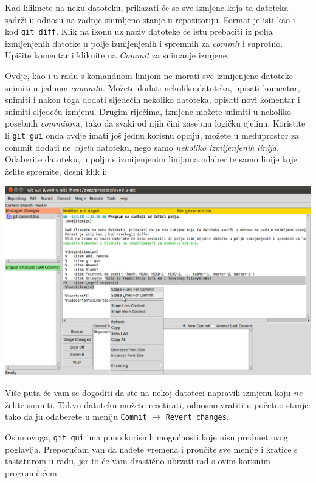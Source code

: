Kad kliknete na neku datoteku, prikazati će se sve izmjene koja ta datoteka sadrži u odnosu na zadnje snimljeno stanje u repozitoriju.
Format je isti kao i kod \verb+git diff+.
Klik na ikonu uz naziv datoteke će istu prebaciti iz polja izmijenjenih datotke u polje izmijenjenih i spremnih za \emph{commit} i suprotno.
Upišite komentar i kliknite na \emph{Commit} za snimanje izmjene.

Ovdje, kao i u radu s komandnom linijom ne morati sve izmijenjene datoteke snimiti u jednom \emph{commit}u. 
Možete dodati nekoliko datoteka, upisati komentar, snimiti i nakon toga dodati sljedećih nekoliko datoteka, opisati novi komentar i snimiti sljedeću izmjenu.
Drugim riječima, izmjene možete snimiti u nekoliko posebnih \emph{commit}ova, tako da svaki od njih čini zasebnu logičku cjelinu.
Koristite li \verb+git gui+ onda ovdje imati još jednu korisnu opciju, možete u međuprostor za commit dodati ne \emph{cijelu} datoteku, nego samo \emph{nekoliko izmijenjenih linija}.
Odaberite datoteku, u polju s izmijenjenim linijama odaberite samo linije koje želite spremite, desni klik i:

\includegraphics[width=14cm]{images/git-gui-stage-lines-to-commit.png}

Više puta će vam se dogoditi da ste na nekoj datoteci napravili izmjenu koju \emph{ne} želite snimiti. 
Takvu datoteku možete resetirati, odnosno vratiti u početno stanje tako da ju odaberete u meniju \verb+Commit+ $\rightarrow$ \verb+Revert changes+.

Osim ovoga, \verb+git gui+ ima puno korisnih mogućnosti koje nisu predmet ovog poglavlja.
Preporučam van da nađete vremena i proučite sve menije i kratice s tastaturom u radu, jer to će vam drastično ubrzati rad s ovim korisnim programčićem.

